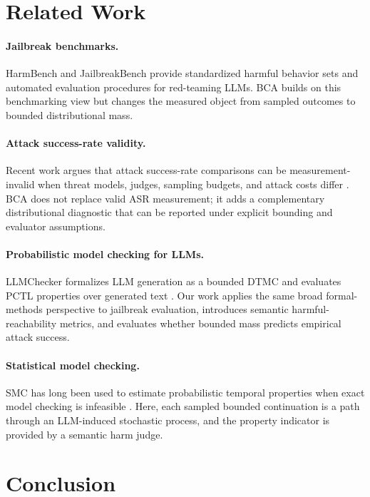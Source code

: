 \documentclass[11pt]{article}
\newcommand{\BCA}{\textsc{BCA}}
\newcommand{\ASR}{\textsc{ASR}}
\newcommand{\DTMC}{\textsc{DTMC}}
\begin{document}
\section{Related Work}
\label{sec:related}

\paragraph{Jailbreak benchmarks.}
HarmBench and JailbreakBench provide standardized harmful behavior sets and automated evaluation procedures for red-teaming LLMs.  \BCA{} builds on this benchmarking view but changes the measured object from sampled outcomes to bounded distributional mass.

\paragraph{Attack success-rate validity.}
Recent work argues that attack success-rate comparisons can be measurement-invalid when threat models, judges, sampling budgets, and attack costs differ \cite{chouldechova2026measurement}.  \BCA{} does not replace valid \ASR{} measurement; it adds a complementary distributional diagnostic that can be reported under explicit bounding and evaluator assumptions.

\paragraph{Probabilistic model checking for LLMs.}
LLMChecker formalizes LLM generation as a bounded \DTMC{} and evaluates PCTL properties over generated text \cite{gross2025llmchecker}.  Our work applies the same broad formal-methods perspective to jailbreak evaluation, introduces semantic harmful-reachability metrics, and evaluates whether bounded mass predicts empirical attack success.

\paragraph{Statistical model checking.}
SMC has long been used to estimate probabilistic temporal properties when exact model checking is infeasible \cite{younes2002probabilistic,legay2010statistical}.  Here, each sampled bounded continuation is a path through an LLM-induced stochastic process, and the property indicator is provided by a semantic harm judge.

\section{Conclusion}
\label{sec:conclusion}
\end{document}
